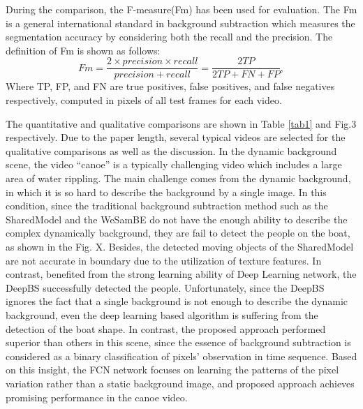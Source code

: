\documentclass[journal]{IEEEtran}
\newcommand{\reftab}[1]{Table \ref{#1}}
\begin{document}
During the comparison, the F-measure(Fm) has been used for evaluation. 
The Fm is a general international standard in background subtraction which measures the segmentation accuracy by considering both the recall and the precision. 
The definition of Fm is shown as follows:
\begin{equation}
Fm= \frac{2\times precision \times recall}{precision + recall} = \frac{2TP}{2TP+FN+FP},
\end{equation}
% 
% 
%
Where TP, FP, and FN are true positives, false positives, and false negatives respectively, computed in pixels of all test frames for each video. 


The quantitative and qualitative comparisons are shown in \reftab{tab1} and Fig.3 respectively. 
Due to the paper length, several typical videos are selected for the qualitative comparisons as well as the discussion. 
In the dynamic background scene, the video “canoe” is a typically challenging video which includes a large area of water rippling. 
The main challenge comes from the dynamic background, in which it is so hard to describe the background by a single image. 
In this condition, since the traditional background subtraction method such as the SharedModel and the WeSamBE do not have the enough ability to describe the complex dynamically background, they are fail to detect the people on the boat, as shown in the Fig. 
X. 
Besides, the detected moving objects of the SharedModel are not accurate in boundary due to the utilization of texture features. 
In contrast, benefited from the strong learning ability of Deep Learning network, the DeepBS successfully detected the people. 
Unfortunately, since the DeepBS ignores the fact that a single background is not enough to describe the dynamic background, even the deep learning based algorithm is suffering from the detection of the boat shape. 
In contrast, the proposed approach performed superior than others in this scene, since the essence of background subtraction is considered as a binary classification of pixels’ observation in time sequence. 
Based on this insight, the FCN network focuses on learning the patterns of the pixel variation rather than a static background image, and proposed approach achieves promising performance in the canoe video.
\end{document}
